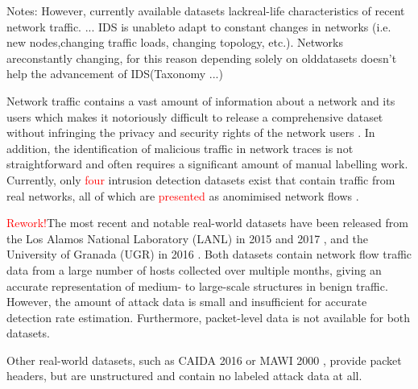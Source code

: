 \documentclass{article}
\begin{document}
Notes:
However, currently available datasets lackreal-life characteristics of recent network traffic. ... IDS is unableto adapt to constant changes in networks (i.e. new nodes,changing traffic loads, changing topology, etc.). Networks areconstantly changing, for this reason depending solely on olddatasets doesn’t help the advancement of IDS(Taxonomy ...)





Network traffic contains a vast amount of information about a network and its users which makes it  notoriously difficult to release a comprehensive dataset without infringing the privacy and security rights of the network users \cite{sperotto2009labeled}. In addition, the identification of malicious traffic in network traces is not straightforward and often requires a significant amount of manual labelling work. Currently, only \textcolor{red}{four} intrusion detection datasets exist that contain traffic from real networks, all of which are \textcolor{red}{presented} as anomimised network flows . 

\textcolor{red}{Rework!}The most recent and notable real-world datasets have been released from the Los Alamos National Laboratory (LANL) in 2015 and 2017 \cite{akent-2015-enterprise-data, turcotte17}, and the University of Granada (UGR) in 2016 \cite{macia2018ugr}. Both datasets contain network flow traffic data from a large number of hosts collected over multiple months, giving an accurate representation of medium- to large-scale structures in benign traffic. However, the amount of attack data is small and insufficient for accurate detection rate estimation. Furthermore, packet-level data is not available for both datasets. 

Other real-world datasets, such as CAIDA 2016 \cite{walsworth2015caida} or MAWI 2000 \cite{sony2000traffic}, provide packet headers, but are unstructured and contain no labeled attack data at all.
\end{document}

